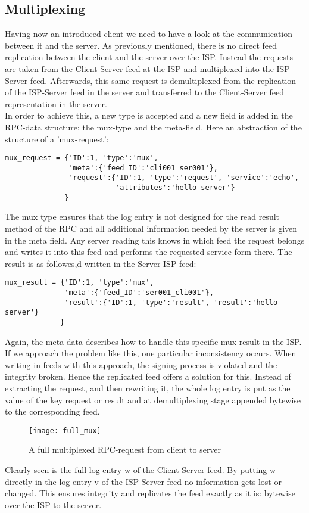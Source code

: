 \subsection{Multiplexing}
Having now an introduced client we need to have a look at the communication between it and the server. As previously mentioned, there is no direct feed replication between the client and the server over the ISP. Instead the requests are taken from the Client-Server feed at the ISP and multiplexed into the ISP-Server feed. Afterwards, this same request is demultiplexed from the replication of the ISP-Server feed in the server and transferred to the Client-Server feed representation in the server.\\
In order to achieve this, a new type is accepted and a new field is added in the RPC-data structure: the mux-type and the meta-field. Here an abstraction of the structure of a ’mux-request’:\\
\begin{lstlisting}
mux_request = {'ID':1, 'type':'mux', 
               'meta':{'feed_ID':'cli001_ser001'},
               'request':{'ID':1, 'type':'request', 'service':'echo', 
                          'attributes':'hello server'}
              }
\end{lstlisting}
The mux type ensures that the log entry is not designed for the read result method of the RPC and all additional information needed by the server is given in the meta field. Any server reading this knows in which feed the request belongs and writes it into this feed and performs the requested service form there. The result is as followes,d written in the Server-ISP
feed:\\
\begin{lstlisting}
mux_result = {'ID':1, 'type':'mux', 
              'meta':{'feed_ID':'ser001_cli001'},
              'result':{'ID':1, 'type':'result', 'result':'hello server'}
             }
\end{lstlisting}
Again, the meta data describes how to handle this specific mux-result in the ISP. If we approach the problem like this, one particular inconsistency occurs. When writing in feeds with this approach, the signing process is violated and the integrity broken. Hence the replicated feed offers a solution for this. Instead of extracting the request, and then rewriting it, the whole log entry is put as the value of the key request or result and at demultiplexing stage appended bytewise to the corresponding feed.
\begin{figure}
    \centering
    \texttt{[image: full\_mux]}
    \caption{A full multiplexed RPC-request from client to server}
    \label{fig:fullmux}
\end{figure}
Clearly seen is the full log entry w of the Client-Server feed. By putting w directly in the log entry v of the ISP-Server feed no information gets lost or changed. This ensures integrity and replicates the feed exactly as it is: bytewise over the ISP to the server.
